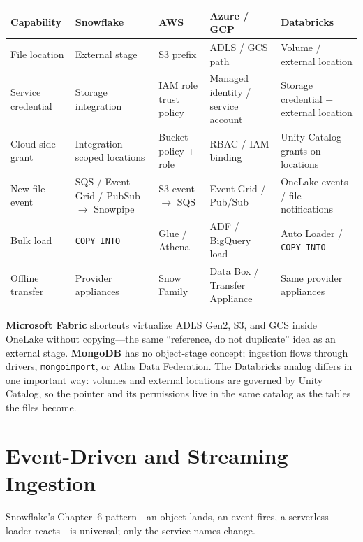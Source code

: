 \begin{center}
\footnotesize
\begin{tabular}{@{}p{2.5cm}p{2.9cm}p{2.7cm}p{2.9cm}p{2.9cm}@{}}
\toprule
\textbf{Capability} & \textbf{Snowflake} & \textbf{AWS} & \textbf{Azure / GCP} & \textbf{Databricks} \\
\midrule
File location & External stage & S3 prefix & ADLS / GCS path & Volume / external location \\
Service credential & Storage integration & IAM role trust policy & Managed identity / service account & Storage credential + external location \\
Cloud-side grant & Integration-scoped locations & Bucket policy + role & RBAC / IAM binding & Unity Catalog grants on locations \\
New-file event & SQS / Event Grid / PubSub $\rightarrow$ Snowpipe & S3 event $\rightarrow$ SQS & Event Grid / Pub/Sub & OneLake events / file notifications \\
Bulk load & \texttt{COPY INTO} & Glue / Athena & ADF / BigQuery load & Auto Loader / \texttt{COPY INTO} \\
Offline transfer & Provider appliances & Snow Family & Data Box / Transfer Appliance & Same provider appliances \\
\bottomrule
\end{tabular}
\end{center}

\noindent \textbf{Microsoft Fabric} shortcuts virtualize ADLS Gen2, S3, and GCS inside OneLake
without copying---the same ``reference, do not duplicate'' idea as an external stage.
\textbf{MongoDB} has no object-stage concept; ingestion flows through drivers,
\texttt{mongoimport}, or Atlas Data Federation. The Databricks analog differs in one important
way: volumes and external locations are governed by Unity Catalog, so the pointer and its
permissions live in the same catalog as the tables the files become.

\section{Event-Driven and Streaming Ingestion}
%
Snowflake's Chapter~6 pattern---an object lands, an event fires, a serverless loader reacts---is
universal; only the service names change.

